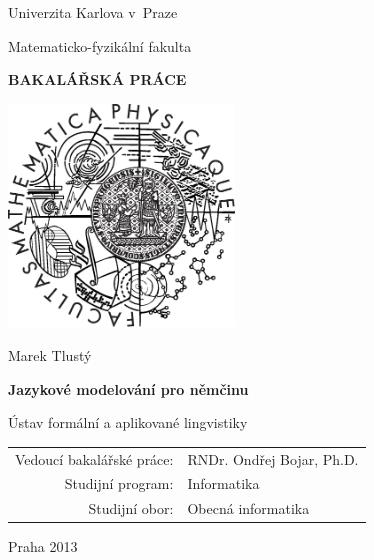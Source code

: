 \documentclass[12pt,a4paper]{report}
\begin{document}


\pagestyle{empty}
\begin{center}

\large

Univerzita Karlova v~Praze

\medskip

Matematicko-fyzikální fakulta

\vfill

{\bf\Large BAKALÁŘSKÁ PRÁCE}

\vfill

\centerline{\mbox{\includegraphics[width=60mm]{./img/logo.eps}}}

\vfill
\vspace{5mm}

{\LARGE Marek Tlustý}

\vspace{15mm}

{\LARGE\bfseries Jazykové modelování pro němčinu}

\vfill

Ústav formální a aplikované lingvistiky

\vfill

\begin{tabular}{rl}

Vedoucí bakalářské práce: & RNDr. Ondřej Bojar, Ph.D. \\
\noalign{\vspace{2mm}}
Studijní program: & Informatika \\
\noalign{\vspace{2mm}}
Studijní obor: & Obecná informatika \\
\end{tabular}

\vfill

Praha 2013

\end{center}
\end{document}
